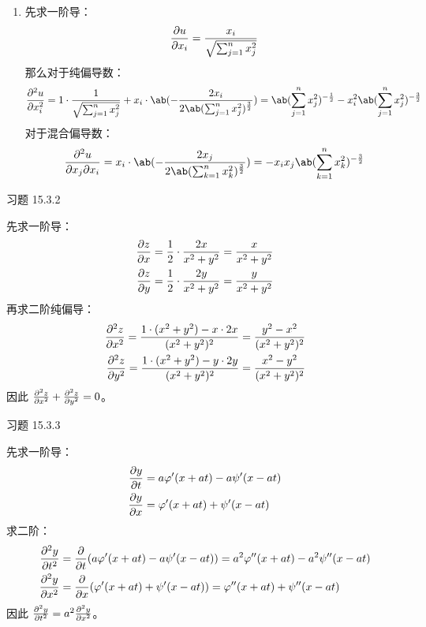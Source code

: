 \begin{problem}
\begin{solution}
\begin{enumerate}
            \item[\textbf{5)}] 先求一阶导：
            $$
            \pdv{u}{x_i} = \frac{x_i}{\sqrt{\sum_{j = 1}^{n} x_j^2}}
            $$
            那么对于纯偏导数：
            $$
            \pdv[2]{u}{x_i} = 1 \cdot \frac{1}{\sqrt{\sum_{j = 1}^{n} x_j^2}} + x_i \cdot \ab(-\frac{2 x_i}{2 \ab(\sum_{j = 1}^{n} x_j^2)^{\frac{3}{2}}}) = \ab(\sum_{j = 1}^{n} x_j^2)^{-\frac{1}{2}} - x_i^2 \ab(\sum_{j = 1}^{n} x_j^2)^{-\frac{3}{2}}
            $$
            对于混合偏导数：
            $$
            \pdv[2]{u}{x_j}{x_i} = x_i \cdot \ab(-\frac{2 x_j}{2 \ab(\sum_{k = 1}^{n} x_k^2)^{\frac{3}{2}}}) = -x_i x_j \ab(\sum_{k = 1}^{n} x_k^2)^{-\frac{3}{2}}
            $$
        \end{enumerate}
    \end{solution}
\end{problem}

\begin{problem}
    习题 15.3.2
    \begin{solution}
        先求一阶导：
        $$
        \begin{aligned}
            \pdv{z}{x} = \frac{1}{2} \cdot \frac{2x}{x^2 + y^2} = \frac{x}{x^2 + y^2} \\
            \pdv{z}{y} = \frac{1}{2} \cdot \frac{2y}{x^2 + y^2} = \frac{y}{x^2 + y^2}
        \end{aligned}
        $$
        再求二阶纯偏导：
        $$
        \begin{aligned}
            \pdv[2]{z}{x} = \frac{1 \cdot (x^2 + y^2) - x \cdot 2x}{(x^2 + y^2)^2} = \frac{y^2 - x^2}{(x^2 + y^2)^2} \\
            \pdv[2]{z}{y} = \frac{1 \cdot (x^2 + y^2) - y \cdot 2y}{(x^2 + y^2)^2} = \frac{x^2 - y^2}{(x^2 + y^2)^2}
        \end{aligned}
        $$
        因此 $\pdv[2]{z}{x} + \pdv[2]{z}{y} = 0$。
    \end{solution}
\end{problem}

\begin{problem}
    习题 15.3.3
    \begin{solution}
        先求一阶导：
        $$
        \begin{aligned}
            \pdv{y}{t} & = a \varphi'(x + a t) - a \psi'(x - a t) \\
            \pdv{y}{x} & = \varphi'(x + a t) + \psi'(x - a t)
        \end{aligned}
        $$
        求二阶：
        $$
        \begin{aligned}
            \pdv[2]{y}{t} & =\pdv{t}(a \varphi'(x + a t) - a \psi'(x - a t)) = a^2 \varphi''(x + a t) - a^2 \psi''(x - a t) \\
            \pdv[2]{y}{x} & =\pdv{x}(\varphi'(x + a t) + \psi'(x - a t)) = \varphi''(x + a t) + \psi''(x - a t)
        \end{aligned}
        $$
        因此 $\pdv[2]{y}{t} = a^2 \pdv[2]{y}{x}$。
    \end{solution}
\end{problem}

